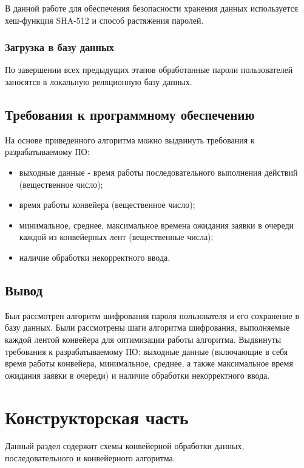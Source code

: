 \documentclass[12pt]{report}
\begin{document}
    В данной работе для обеспечения безопасности хранения данных используется хеш-функция SHA-512 и способ растяжения паролей.
    
    \subsection{Загрузка в базу данных}
    По завершении всех предыдущих этапов обработанные пароли пользователей заносятся в локальную реляционную базу данных.
    
    \section{Требования к программному обеспечению}
    На основе приведенного алгоритма можно выдвинуть требования к разрабатываемому ПО:
    \begin{itemize}
    	\item выходные данные - время работы последовательного выполнения действий (вещественное число);
    	\item время работы конвейера (вещественное число);
    	\item минимальное, среднее, максимальное времена ожидания заявки в очереди каждой из конвейерных лент (вещественные числа);
    	\item наличие обработки некорректного ввода.
    \end{itemize}
    
    \section{Вывод}
    Был рассмотрен алгоритм шифрования пароля пользователя и его сохранение в базу данных.
    Были рассмотрены шаги алгоритма шифрования, выполняемые каждой лентой конвейера для оптимизации работы алгоритма.
    Выдвинуты требования к разрабатываемому ПО: выходные данные (включающие в себя время работы конвейера, минимальное, среднее, а также максимальное время ожидания заявки в очереди) и наличие обработки некорректного ввода.
    
    \newpage
    
    \chapter{Конструкторская часть}
    Данный раздел содержит схемы конвейерной обработки данных, последовательного и конвейерного алгоритма.
    
\end{document}
